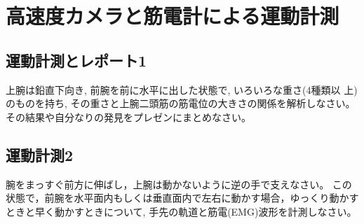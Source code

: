 \documentclass{jsarticle}
\begin{document}


\section{高速度カメラと筋電計による運動計測}

\subsection{運動計測とレポート1}
上腕は鉛直下向き, 前腕を前に水平に出した状態で, いろいろな重さ(4種類以
上)のものを持ち, その重さと上腕二頭筋の筋電位の大きさの関係を解析しなさい。
その結果や自分なりの発見をプレゼンにまとめなさい。

\subsection{運動計測2}

腕をまっすぐ前方に伸ばし，上腕は動かないように逆の手で支えなさい。
この状態で，前腕を水平面内もしくは垂直面内で左右に動かす場合，ゆっくり動かすときと早く動かすときについて, 手先の軌道と筋電(EMG)波形を計測しなさい。
\end{document}
